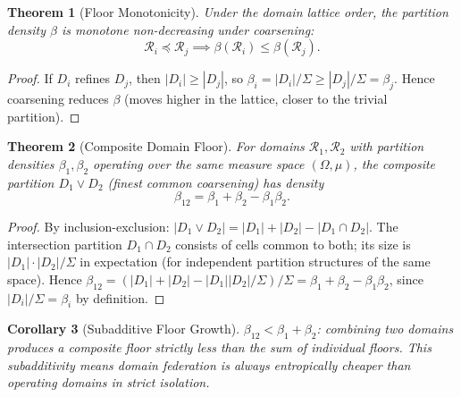\documentclass[twocolumn,11pt,a4paper]{article}
\theoremstyle{plain}
\newtheorem{theorem}{Theorem}[section]
\newtheorem{corollary}[theorem]{Corollary}
\theoremstyle{definition}
\theoremstyle{remark}
\newcommand{\abs}[1]{\left|#1\right|}
\begin{document}
\begin{theorem}[Floor Monotonicity]
\label{thm:monotone}
Under the domain lattice order, the partition density $\beta$ is monotone non-decreasing under coarsening:
\begin{equation}
  \mathcal{R}_i \preceq \mathcal{R}_j \implies \beta(\mathcal{R}_i) \le \beta(\mathcal{R}_j).
\end{equation}
\end{theorem}

\begin{proof}
If $D_i$ refines $D_j$, then $\abs{D_i} \ge \abs{D_j}$, so $\beta_i = \abs{D_i}/\Sigma \ge \abs{D_j}/\Sigma = \beta_j$.  Hence coarsening reduces $\beta$ (moves higher in the lattice, closer to the trivial partition).
\end{proof}

\begin{theorem}[Composite Domain Floor]
\label{thm:composite_floor}
For domains $\mathcal{R}_1, \mathcal{R}_2$ with partition densities $\beta_1, \beta_2$ operating over the same measure space $(\Omega,\mu)$, the composite partition $D_1 \vee D_2$ (finest common coarsening) has density
\begin{equation}
  \beta_{12} = \beta_1 + \beta_2 - \beta_1\beta_2.
  \label{eq:composite_density}
\end{equation}
\end{theorem}

\begin{proof}
By inclusion-exclusion: $\abs{D_1 \vee D_2} = \abs{D_1} + \abs{D_2} - \abs{D_1 \cap D_2}$.  The intersection partition $D_1 \cap D_2$ consists of cells common to both; its size is $\abs{D_1}\cdot\abs{D_2}/\Sigma$ in expectation (for independent partition structures of the same space).  Hence $\beta_{12} = (\abs{D_1}+\abs{D_2}-\abs{D_1}\abs{D_2}/\Sigma)/\Sigma = \beta_1 + \beta_2 - \beta_1\beta_2$, since $\abs{D_i}/\Sigma = \beta_i$ by definition.
\end{proof}

\begin{corollary}[Subadditive Floor Growth]
\label{cor:subadditive}
$\beta_{12} < \beta_1 + \beta_2$: combining two domains produces a composite floor strictly less than the sum of individual floors.  This subadditivity means domain federation is \emph{always} entropically cheaper than operating domains in strict isolation.
\end{corollary}

\end{document}
